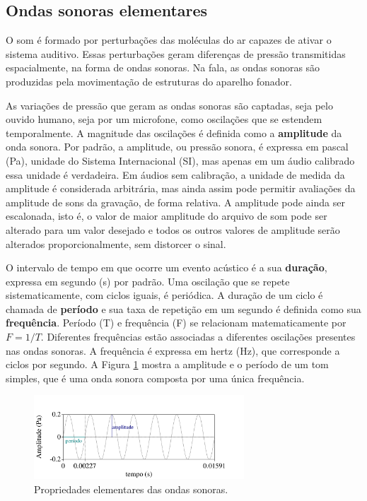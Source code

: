 \documentclass[portuguese]{textolivre}
\begin{document}
\subsection{Ondas sonoras elementares}\label{sec-ondas}
O som é formado por perturbações das moléculas do ar capazes de ativar o sistema auditivo. Essas perturbações geram diferenças de pressão transmitidas espacialmente, na forma de ondas sonoras. Na fala, as ondas sonoras são produzidas pela movimentação de estruturas do aparelho fonador. 

As variações de pressão que geram as ondas sonoras são captadas, seja pelo ouvido humano, seja por um microfone, como oscilações que se estendem temporalmente. A magnitude das oscilações é definida como a \textbf{amplitude} da onda sonora. Por padrão, a amplitude, ou pressão sonora, é expressa em pascal (Pa), unidade do Sistema Internacional (SI), mas apenas em um áudio calibrado essa unidade é verdadeira. Em áudios sem calibração, a unidade de medida da amplitude é considerada arbitrária, mas ainda assim pode permitir avaliações da amplitude de sons da gravação, de forma relativa. A amplitude pode ainda ser escalonada, isto é, o valor de maior amplitude do arquivo de som pode ser alterado para um valor desejado e todos os outros valores de amplitude serão alterados proporcionalmente, sem distorcer o sinal. 

O intervalo de tempo em que ocorre um evento acústico é a sua \textbf{duração}, expressa em segundo (s) por padrão. Uma oscilação que se repete sistematicamente, com ciclos iguais, é periódica. A duração de um ciclo é chamada de \textbf{período} e sua taxa de repetição em um segundo é definida como sua \textbf{frequência}. Período (T) e frequência (F) se relacionam matematicamente por \(F = 1 / T\). Diferentes frequências estão associadas a diferentes oscilações presentes nas ondas sonoras. A frequência é expressa em hertz (Hz), que corresponde a ciclos por segundo. A Figura \ref{fig4} mostra a amplitude e o período de um tom simples, que é uma onda sonora composta por uma única frequência. 

\begin{figure}[htbp]
 \centering
 \includegraphics[width=0.7\textwidth]{Fig4.pdf}
 \caption{Propriedades elementares das ondas sonoras.}
 \label{fig4}
\end{figure}
\end{document}
